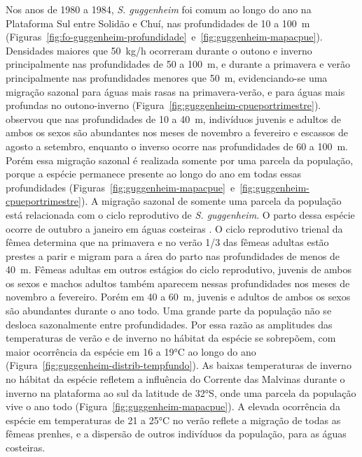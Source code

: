 \documentclass[a4paper,11pt,twoside,showtrims,onecolumn,openright,final]{memoir}
\begin{document}
Nos anos de 1980 a 1984, \emph{S. guggenheim} foi comum ao longo do ano na Plataforma Sul 
entre Solidão e Chuí, nas profundidades de 10 a 100~m (Figuras~\ref{fig:fo-guggenheim-profundidade}~e~\ref{fig:guggenheim-mapacpue}). %
Densidades maiores que 50~kg/h ocorreram durante o outono e inverno principalmente nas 
profundidades de  50 a 100~m, e durante a primavera e verão principalmente nas profundidades 
menores que 50~m, evidenciando-se uma migração sazonal para águas mais rasas na primavera-verão, 
e para águas mais profundas no outono-inverno (Figura~\ref{fig:guggenheim-cpueportrimestre}). %
\citet{silva1996} observou que nas profundidades 
de 10 a 40~m, indivíduos juvenis e adultos de ambos os sexos são abundantes nos meses de novembro 
a fevereiro e escassos de agosto a setembro, enquanto o inverso ocorre nas profundidades 
de 60 a 100~m. Porém essa migração sazonal é realizada somente por uma parcela da população, 
porque a espécie permanece presente ao longo do ano em todas essas profundidades (Figuras~\ref{fig:guggenheim-mapacpue}~e~\ref{fig:guggenheim-cpueportrimestre}). 
A migração sazonal de somente uma parcela da população está relacionada com  o ciclo 
reprodutivo de \emph{S. guggenheim}. O parto dessa espécie ocorre de 
outubro a janeiro em águas costeiras \citep{silva1996}. %
O ciclo reprodutivo trienal da fêmea determina que na primavera e no verão 1/3 das fêmeas 
adultas estão prestes a parir e migram para a área do parto nas profundidades de menos de 40~m. 
Fêmeas adultas em outros estágios do ciclo reprodutivo, juvenis de ambos os sexos e machos adultos 
também aparecem nessas profundidades nos meses de novembro a fevereiro. Porém em 40 a 60~m, 
juvenis e adultos de ambos os sexos são abundantes durante o ano todo. Uma grande parte da população 
não se desloca sazonalmente entre profundidades. Por essa razão as amplitudes das temperaturas 
de verão e de inverno no hábitat da espécie se sobrepõem, com maior ocorrência da espécie 
em 16 a 19°C ao longo do ano (Figura~\ref{fig:guggenheim-distrib-tempfundo}). %
As baixas temperaturas de inverno no hábitat  
da espécie refletem a influência do Corrente das Malvinas durante o inverno na plataforma 
ao sul da latitude de 32°S, onde uma parcela da população vive o ano todo (Figura~\ref{fig:guggenheim-mapacpue}). 
A elevada ocorrência da espécie em temperaturas de 21 a 25°C no verão reflete a migração 
de todas as fêmeas prenhes, e a dispersão de outros indivíduos da população, para as águas costeiras. 
\end{document}
